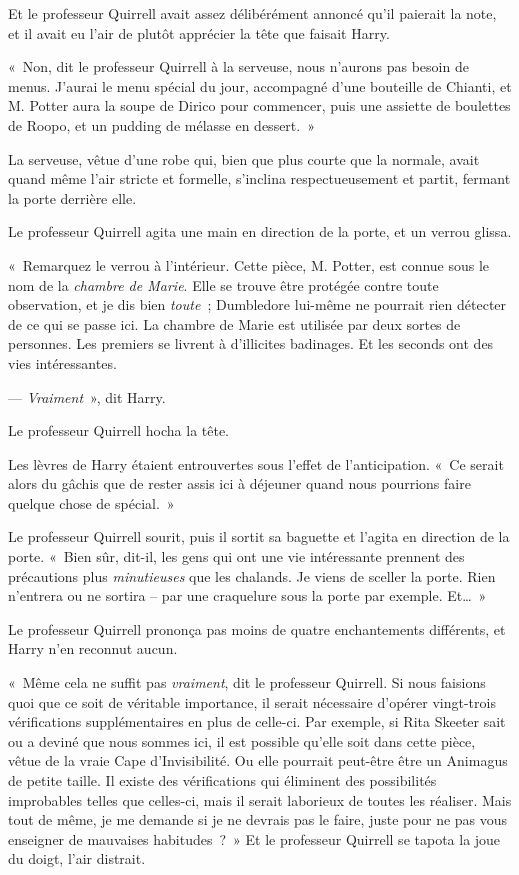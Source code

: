 Et le professeur Quirrell avait assez délibérément annoncé qu'il paierait la note, et il avait eu l'air de plutôt apprécier la tête que faisait Harry.

«~Non, dit le professeur Quirrell à la serveuse, nous n'aurons pas besoin de menus. J'aurai le menu spécial du jour, accompagné d'une bouteille de Chianti, et M. Potter aura la soupe de Dirico pour commencer, puis une assiette de boulettes de Roopo, et un pudding de mélasse en dessert.~»

La serveuse, vêtue d’une robe qui, bien que plus courte que la normale, avait quand même l'air stricte et formelle, s'inclina respectueusement et partit, fermant la porte derrière elle.

Le professeur Quirrell agita une main en direction de la porte, et un verrou glissa.

«~Remarquez le verrou à l'intérieur. Cette pièce, M. Potter, est connue sous le nom de la \emph{chambre de Marie}. Elle se trouve être protégée contre toute observation, et je dis bien \emph{toute}~; Dumbledore lui-même ne pourrait rien détecter de ce qui se passe ici. La chambre de Marie est utilisée par deux sortes de personnes. Les premiers se livrent à d'illicites badinages. Et les seconds ont des vies intéressantes.

--- \emph{Vraiment}~», dit Harry.

Le professeur Quirrell hocha la tête.

Les lèvres de Harry étaient entrouvertes sous l'effet de l'anticipation. «~Ce serait alors du gâchis que de rester assis ici à déjeuner quand nous pourrions faire quelque chose de spécial.~»

Le professeur Quirrell sourit, puis il sortit sa baguette et l'agita en direction de la porte. «~Bien sûr, dit-il, les gens qui ont une vie intéressante prennent des précautions plus \emph{minutieuses} que les chalands. Je viens de sceller la porte. Rien n'entrera ou ne sortira -- par une craquelure sous la porte par exemple. Et…~»

Le professeur Quirrell prononça pas moins de quatre enchantements différents, et Harry n'en reconnut aucun.

«~Même cela ne suffit pas \emph{vraiment}, dit le professeur Quirrell. Si nous faisions quoi que ce soit de véritable importance, il serait nécessaire d'opérer vingt-trois vérifications supplémentaires en plus de celle-ci. Par exemple, si Rita Skeeter sait ou a deviné que nous sommes ici, il est possible qu'elle soit dans cette pièce, vêtue de la vraie Cape d'Invisibilité. Ou elle pourrait peut-être être un Animagus de petite taille. Il existe des vérifications qui éliminent des possibilités improbables telles que celles-ci, mais il serait laborieux de toutes les réaliser. Mais tout de même, je me demande si je ne devrais pas le faire, juste pour ne pas vous enseigner de mauvaises habitudes~?~» Et le professeur Quirrell se tapota la joue du doigt, l'air distrait.

